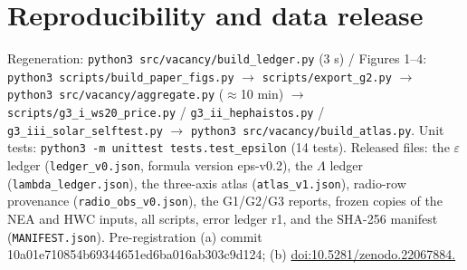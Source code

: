 \documentclass{aa}
\begin{document}
\section{Reproducibility and data release}
\noindent Regeneration: \texttt{python3 src/vacancy/build\_ledger.py} (3 s) / Figures 1--4: \texttt{python3 scripts/build\_paper\_figs.py} \(\rightarrow\) \texttt{scripts/export\_g2.py} \(\rightarrow\) \texttt{python3 src/vacancy/aggregate.py} (\(\approx\)10 min) \(\rightarrow\) \texttt{scripts/g3\_i\_ws20\_price.py} / \texttt{g3\_ii\_hephaistos.py} / \texttt{g3\_iii\_solar\_selftest.py} \(\rightarrow\) \texttt{python3 src/vacancy/build\_atlas.py}. Unit tests: \texttt{python3 -m unittest tests.test\_epsilon} (14 tests). Released files: the \(\varepsilon\) ledger (\texttt{ledger\_v0.json}, formula version eps-v0.2), the \(\Lambda\) ledger (\texttt{lambda\_ledger.json}), the three-axis atlas (\texttt{atlas\_v1.json}), radio-row provenance (\texttt{radio\_obs\_v0.json}), the G1/G2/G3 reports, frozen copies of the NEA and HWC inputs, all scripts, error ledger r1, and the SHA-256 manifest (\texttt{MANIFEST.json}). Pre-registration (a) commit 10a01e710854b69344651ed6ba016ab303c9d124; (b) \url{doi:10.5281/zenodo.22067884.}\par\smallskip
\end{document}
